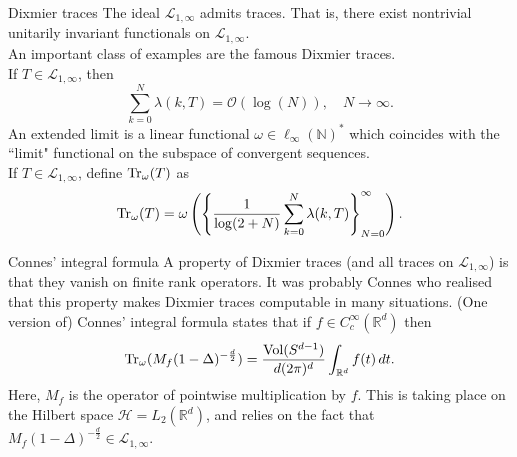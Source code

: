 \documentclass{beamer}
\numberwithin{equation}{section}
\theoremstyle{plain}
\theoremstyle{plain}
\theoremstyle{definition}
\theoremstyle{plain}
\theoremstyle{plain}
\theoremstyle{definition}
\newcommand{\tr}{{\rm Tr}}
\newcommand{\Vol}{\mathrm{Vol}}
\newcommand{\Rl}{\mathbb{R}}
\begin{document}
\begin{frame}{Dixmier traces}
    The ideal $\mathcal{L}_{1,\infty}$ admits traces. That is, there exist nontrivial unitarily invariant functionals on $\mathcal{L}_{1,\infty}$.\\
    \pause
    An important class of examples are the famous Dixmier traces.\\
    If $T \in \mathcal{L}_{1,\infty}$, then
    \begin{equation*}
        \sum_{k=0}^N \lambda(k,T) = \mathcal{O}(\log(N)),\quad N\to\infty.
    \end{equation*}
    \pause
    An extended limit is a linear functional $\omega \in \ell_{\infty}(\mathbb{N})^*$
    which coincides with the ``limit" functional on the subspace of convergent sequences.\\
    If $T \in \mathcal{L}_{1,\infty}$, define $\tr_{\omega}(T)$
    as
    $$
        \tr_\omega(T) = \omega\left(\left\{\frac{1}{\log(2+N)}\sum_{k=0}^N \lambda(k,T)\right\}_{N=0}^\infty\right).
    $$
\end{frame}



\begin{frame}{Connes' integral formula}
    A property of Dixmier traces (and all traces on $\mathcal{L}_{1,\infty}$) is that they vanish on finite rank operators.
    \pause
    It was probably Connes who realised that this property makes Dixmier traces computable in many situations. (One version of) Connes' integral formula states that
    if $f \in C^\infty_c(\Rl^d)$ then
    $$
        \tr_{\omega}(M_f(1-\Delta)^{-\frac{d}{2}}) = \frac{\Vol(S^{d-1})}{d(2\pi)^d}\int_{\Rl^d} f(t)\,dt.
    $$     
    Here, $M_f$ is the operator of pointwise multiplication by $f.$
    This is taking place on the Hilbert space $\mathcal{H} = L_2(\Rl^d)$, and relies on the fact that $M_f(1-\Delta)^{-\frac{d}{2}} \in \mathcal{L}_{1,\infty}.$
\end{frame}
\end{document}
